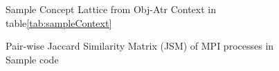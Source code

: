 \begin{figure}[t]
\centering
{}
\caption{Sample Concept Lattice from Obj-Atr Context in table\ref{tab:sampleContext}}
\label{fig:sampleCL}
\end{figure}



\begin{figure}[]
\centering
{}
\caption{Pair-wise Jaccard Similarity Matrix (JSM) of MPI processes in Sample code}
\label{fig:jsm2}
\end{figure}




